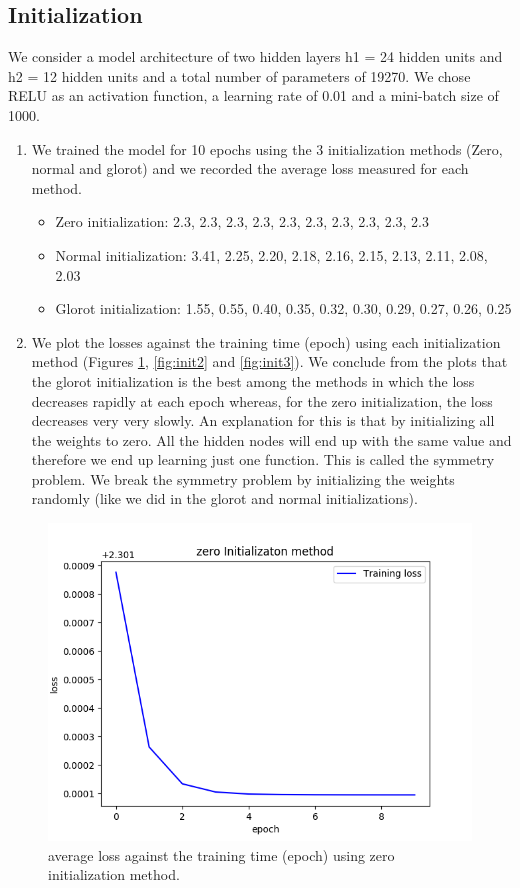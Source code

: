 \documentclass[a4paper]{article}
\begin{document}
\subsection{Initialization}
We consider a model architecture of two hidden layers h1 = 24 hidden units and h2 = 12 hidden units and a total number of parameters of 19270. We chose RELU as an activation function, a learning
rate of 0.01 and a mini-batch size of 1000.
\begin{enumerate}
  \item We trained the model for 10 epochs using the 3 initialization methods (Zero, normal and glorot) and we recorded the average
loss measured for each method.

\begin{itemize}
  \item Zero initialization: 2.3, 2.3, 2.3, 2.3, 2.3, 2.3, 2.3, 2.3, 2.3, 2.3
  \item Normal initialization: 3.41, 2.25, 2.20, 2.18, 2.16, 2.15, 2.13, 2.11, 2.08, 2.03
  \item Glorot initialization: 1.55, 0.55, 0.40, 0.35, 0.32, 0.30, 0.29, 0.27, 0.26, 0.25
\end{itemize}

\item We plot the losses against the training time (epoch) using each initialization method (Figures \ref{fig:init1}, \ref{fig:init2} and \ref{fig:init3}). We conclude from the plots that the glorot initialization is the best among the methods in which the loss decreases rapidly at each epoch whereas, for the zero initialization, the loss decreases very very slowly. An explanation for this is that by initializing all the weights to zero. All the hidden nodes will end up with the same value and therefore we end up learning just one function. This is called the symmetry problem. We break the symmetry problem by initializing the weights randomly (like we did in the glorot and normal initializations).

\end{enumerate}


\begin{figure}
\centering
\includegraphics[width=1\textwidth]{zero_init.png}
\caption{\label{fig:init1}average loss against the training time (epoch) using zero initialization method.}
\end{figure}
\end{document}
